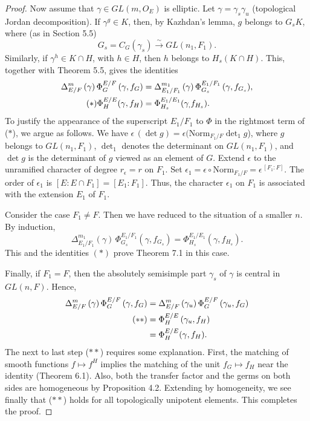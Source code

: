 \documentclass{amsart}
\begin{document}
\begin{proof}
Now assume that $\gamma\in GL(m,O_E)$ is elliptic.
Let
  $ \gamma = \gamma_s \gamma_u $
(topological Jordan decomposition).
If
  $ \gamma^g \in K $,
then, by Kazhdan's lemma,
  $g$ belongs to $G_s K$, where (as in Section 5.5)
%
$$
  G_s = C_G(\gamma_s) 
  \overset \sim \to %
  GL (n_1, F_1).
$$
Similarly, if $\gamma^h\in K\cap H$, with $h\in H$, then $h$ belongs
to $H_s(K\cap H)$.
%
This, together with Theorem 5.5, gives the identities
%
\begin{align*}\label{eqn:star2}
 \Delta_{E/F}^m \,
  (\gamma) \,
  \Phi_G^{E/F} \,
  (\gamma, f_G ) &=
  \Delta_{E_1/F_1}^{m_1} \,
  (\gamma) \,
  \Phi_{G_s}^{E_1/F_1} \,
  (\gamma, f_{G_s}),\\ 
  \vspace{4pt}
  \tag{$*$}
  \Phi^{E/E}_H(\gamma,f_H) &= \Phi^{E_1/E_1}_{H_s}(\gamma_,f_{H_s}).
\end{align*}
%
To justify the appearance of the superscript
  $ E_1 / F_1 $
to
  $ \Phi $
in the rightmost term of ($*$), we argue as follows.
We have   $ \epsilon \, (\det g) =
    \epsilon (\text{Norm}_{F_1/F}\det_1
    g$),
where $g$ belongs to $GL(n_1,F_1)$, $\det_1$ denotes the
determinant on $GL(n_1,F_1)$, and $\det g$ is the determinant
of $g$ viewed as an element of $G$.
Extend
  $ \epsilon $
to the unramified character of degree
  $ r_{\epsilon} = r $
on 
  $ F_1 $.
Set $\epsilon_1 = 
   \epsilon \circ \text{Norm}_{F_1/F} =
    \epsilon^{\,[F_1:F]}$.
The order of
  $ \epsilon_1 $
is 
  $ [E: E\cap F_1] = [E_1 : F_1 ] $.
Thus, the character
  $ \epsilon_1 $ 
on 
  $ F_1 $
is associated with the extension 
  $ E_1 $ of
  $ F_1 $.


Consider the case
  $ F_1 \neq F $.
Then we have reduced to the situation of a smaller $n$.
By induction,
%
$$
  \Delta_{E_1/F_1}^{m_1} (\gamma) \,
  \Phi_{G_s}^{E_1/F_1} (\gamma, f_{G_s} ) =
  \Phi_{H_s}^{E_1/E_1}  (\gamma, f_{H_s} ) .
$$
%
This and the identities $(*)$ prove Theorem 7.1 in this case.
%

Finally, if
  $ F_1 = F $,
then the absolutely semisimple part
  $ \gamma_s $
of
  $ \gamma $
is central in
  $ GL(n,F) $.
Hence,
%
\begin{align*}\label{eqn:double-star}
 \Delta_{E/F}^m \,
  (\gamma) \,
  \Phi_G^{E/F} \,
  (\gamma, f_G)
&=
  \Delta_{E/F}^m \,
  (\gamma_u) \,
  \Phi_G^{E/F} \,
  (\gamma_u, f_G )
\\
\vspace{4pt}
\tag{$**$}
&=
  \Phi_H^{E/E} \,
  (\gamma_u, f_H ) 
\\
&=
  \Phi_H^{E/E}
  (\gamma, f_H).
\end{align*}
%
The next to last step ($**$) requires some explanation.
First, the matching of smooth functions
  $ f \mapsto f^H $
implies the matching 
of the unit
  $ f_G \mapsto f_H$
near the identity (Theorem 6.1).
Also, both the transfer factor and the germs on both sides are
  homogeneous by Proposition 4.2.
Extending by homogeneity, we see finally that
  ($**$) holds for all topologically unipotent elements.
This completes the proof.
\end{proof}
\end{document}
